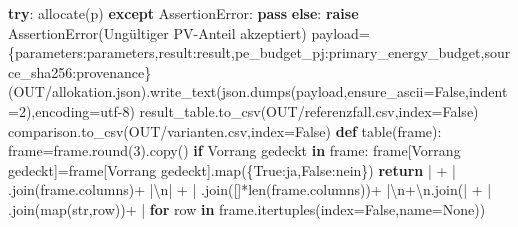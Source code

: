 \documentclass[
  ngerman,
  a4paper,
  DIV=11]{scrreprt}
\newenvironment{Shaded}{\begin{snugshade}}{\end{snugshade}}
\newcommand{\BuiltInTok}[1]{\textcolor[rgb]{0.00,0.23,0.31}{#1}}
\newcommand{\CharTok}[1]{\textcolor[rgb]{0.13,0.47,0.30}{#1}}
\newcommand{\ControlFlowTok}[1]{\textcolor[rgb]{0.00,0.23,0.31}{\textbf{#1}}}
\newcommand{\DecValTok}[1]{\textcolor[rgb]{0.68,0.00,0.00}{#1}}
\newcommand{\KeywordTok}[1]{\textcolor[rgb]{0.00,0.23,0.31}{\textbf{#1}}}
\newcommand{\NormalTok}[1]{\textcolor[rgb]{0.00,0.23,0.31}{#1}}
\newcommand{\OperatorTok}[1]{\textcolor[rgb]{0.37,0.37,0.37}{#1}}
\newcommand{\PreprocessorTok}[1]{\textcolor[rgb]{0.68,0.00,0.00}{#1}}
\newcommand{\StringTok}[1]{\textcolor[rgb]{0.13,0.47,0.30}{#1}}
\newcommand{\VariableTok}[1]{\textcolor[rgb]{0.07,0.07,0.07}{#1}}
\begin{document}
\begin{Shaded}
\begin{Highlighting}[]
    \ControlFlowTok{try}\NormalTok{: allocate(p)}
    \ControlFlowTok{except} \PreprocessorTok{AssertionError}\NormalTok{: }\ControlFlowTok{pass}
    \ControlFlowTok{else}\NormalTok{: }\ControlFlowTok{raise} \PreprocessorTok{AssertionError}\NormalTok{(}\StringTok{\textquotesingle{}Ungültiger PV{-}Anteil akzeptiert\textquotesingle{}}\NormalTok{)}
\NormalTok{payload}\OperatorTok{=}\NormalTok{\{}\StringTok{\textquotesingle{}parameters\textquotesingle{}}\NormalTok{:parameters,}\StringTok{\textquotesingle{}result\textquotesingle{}}\NormalTok{:result,}\StringTok{\textquotesingle{}pe\_budget\_pj\textquotesingle{}}\NormalTok{:primary\_energy\_budget,}\StringTok{\textquotesingle{}source\_sha256\textquotesingle{}}\NormalTok{:provenance\}}
\NormalTok{(OUT}\OperatorTok{/}\StringTok{\textquotesingle{}allokation.json\textquotesingle{}}\NormalTok{).write\_text(json.dumps(payload,ensure\_ascii}\OperatorTok{=}\VariableTok{False}\NormalTok{,indent}\OperatorTok{=}\DecValTok{2}\NormalTok{),encoding}\OperatorTok{=}\StringTok{\textquotesingle{}utf{-}8\textquotesingle{}}\NormalTok{)}
\NormalTok{result\_table.to\_csv(OUT}\OperatorTok{/}\StringTok{\textquotesingle{}referenzfall.csv\textquotesingle{}}\NormalTok{,index}\OperatorTok{=}\VariableTok{False}\NormalTok{)}
\NormalTok{comparison.to\_csv(OUT}\OperatorTok{/}\StringTok{\textquotesingle{}varianten.csv\textquotesingle{}}\NormalTok{,index}\OperatorTok{=}\VariableTok{False}\NormalTok{)}
\KeywordTok{def}\NormalTok{ table(frame):}
\NormalTok{    frame}\OperatorTok{=}\NormalTok{frame.}\BuiltInTok{round}\NormalTok{(}\DecValTok{3}\NormalTok{).copy()}
    \ControlFlowTok{if} \StringTok{\textquotesingle{}Vorrang gedeckt\textquotesingle{}} \KeywordTok{in}\NormalTok{ frame: frame[}\StringTok{\textquotesingle{}Vorrang gedeckt\textquotesingle{}}\NormalTok{]}\OperatorTok{=}\NormalTok{frame[}\StringTok{\textquotesingle{}Vorrang gedeckt\textquotesingle{}}\NormalTok{].}\BuiltInTok{map}\NormalTok{(\{}\VariableTok{True}\NormalTok{:}\StringTok{\textquotesingle{}ja\textquotesingle{}}\NormalTok{,}\VariableTok{False}\NormalTok{:}\StringTok{\textquotesingle{}nein\textquotesingle{}}\NormalTok{\})}
    \ControlFlowTok{return} \StringTok{\textquotesingle{}| \textquotesingle{}}\OperatorTok{+}\StringTok{\textquotesingle{} | \textquotesingle{}}\NormalTok{.join(frame.columns)}\OperatorTok{+}\StringTok{\textquotesingle{} |}\CharTok{\textbackslash{}n}\StringTok{| \textquotesingle{}}\OperatorTok{+}\StringTok{\textquotesingle{} | \textquotesingle{}}\NormalTok{.join([}\StringTok{\textquotesingle{}{-}{-}{-}\textquotesingle{}}\NormalTok{]}\OperatorTok{*}\BuiltInTok{len}\NormalTok{(frame.columns))}\OperatorTok{+}\StringTok{\textquotesingle{} |}\CharTok{\textbackslash{}n}\StringTok{\textquotesingle{}}\OperatorTok{+}\StringTok{\textquotesingle{}}\CharTok{\textbackslash{}n}\StringTok{\textquotesingle{}}\NormalTok{.join(}\StringTok{\textquotesingle{}| \textquotesingle{}}\OperatorTok{+}\StringTok{\textquotesingle{} | \textquotesingle{}}\NormalTok{.join(}\BuiltInTok{map}\NormalTok{(}\BuiltInTok{str}\NormalTok{,row))}\OperatorTok{+}\StringTok{\textquotesingle{} |\textquotesingle{}} \ControlFlowTok{for}\NormalTok{ row }\KeywordTok{in}\NormalTok{ frame.itertuples(index}\OperatorTok{=}\VariableTok{False}\NormalTok{,name}\OperatorTok{=}\VariableTok{None}\NormalTok{))}

\end{Highlighting}
\end{Shaded}
\end{document}
